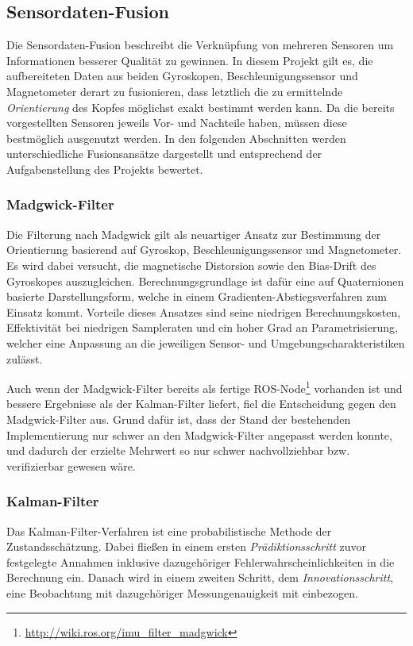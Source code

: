 \subsection{Sensordaten-Fusion}
\label{headtracking_fusion_subsec}
Die Sensordaten-Fusion beschreibt die Verknüpfung von mehreren Sensoren um Informationen besserer Qualität zu gewinnen.
In diesem Projekt gilt es, die aufbereiteten Daten aus beiden Gyroskopen, Beschleunigungssensor und Magnetometer derart zu fusionieren, dass letztlich die zu ermittelnde \emph{Orientierung} des Kopfes möglichst exakt bestimmt werden kann.
Da die bereits vorgestellten Sensoren jeweils Vor- und Nachteile haben, müssen diese bestmöglich ausgenutzt werden.
In den folgenden Abschnitten werden unterschiedliche Fusionsansätze dargestellt und entsprechend der Aufgabenstellung des Projekts bewertet. 

\subsubsection{Madgwick-Filter}
Die Filterung nach Madgwick \cite{madgwick2010efficient} gilt als neuartiger Ansatz zur Bestimmung der Orientierung basierend auf Gyroskop, Beschleunigungssensor und Magnetometer.
Es wird dabei versucht, die magnetische Distorsion sowie den Bias-Drift des Gyroskopes auszugleichen.
Berechnungsgrundlage ist dafür eine auf Quaternionen basierte Darstellungsform, welche in einem Gradienten-Abstiegsverfahren zum Einsatz kommt.
Vorteile dieses Ansatzes sind seine niedrigen Berechnungskosten, Effektivität bei niedrigen Sampleraten und ein hoher Grad an Parametrisierung, welcher eine Anpassung an die jeweiligen Sensor- und Umgebungscharakteristiken zulässt.

Auch wenn der Madgwick-Filter bereits als fertige \ac{ROS}-Node\footnote{\url{http://wiki.ros.org/imu_filter_madgwick}} vorhanden ist und bessere Ergebnisse als der Kalman-Filter liefert, fiel die Entscheidung gegen den Madgwick-Filter aus.
Grund dafür ist, dass der Stand der bestehenden Implementierung nur schwer an den Madgwick-Filter angepasst werden konnte, und dadurch der erzielte Mehrwert so nur schwer nachvollziehbar bzw. verifizierbar gewesen wäre. 

\subsubsection{Kalman-Filter}
Das Kalman-Filter-Verfahren \cite{kalman1960new} ist eine probabilistische Methode der Zustandsschätzung.
Dabei fließen in einem ersten \emph{Prädiktionsschritt} zuvor festgelegte Annahmen inklusive dazugehöriger Fehlerwahrscheinlichkeiten in die Berechnung ein.
Danach wird in einem zweiten Schritt, dem \emph{Innovationsschritt}, eine Beobachtung mit dazugehöriger Messungenauigkeit mit einbezogen.

